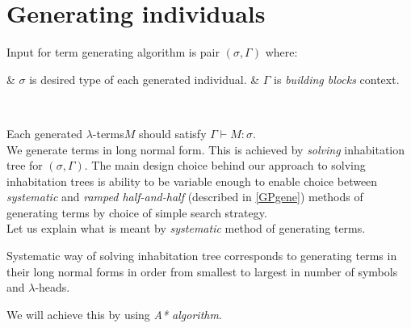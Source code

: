 \documentclass[12pt,a4paper]{report}
\makeatletter
\newcommand{\Lets}{Let us\xspace}
\newcommand{\lterms}{$\lambda$-terms\xspace}
\newcommand{\lheads}{$\lambda$-heads\xspace}
\newcommand{\turst}[3]{$#1\vdash{}#2:#3$\xspace}
\newcommand{\GMS}{\turst{\Gamma}{M}{\sigma}}
\newcommand{\atTree}{@-tree\xspace}
\newenvironment{enum}
{\begin{easylist}[itemize]}
{\end{easylist}}
\newenvironment{todo}
{ ~\\[0.5em]
  {\color{red}\textbf{TODO}}
  \begin{easylist}[itemize]}
{ \end{easylist}
  ~}
\makeatother
\begin{document}

\section{Generating individuals}



Input for term generating algorithm is pair $(\sigma,\Gamma)$ where:\\

\begin{enum}
 & $\sigma$ is desired type of each generated individual.
 & $\Gamma$ is \textit{building blocks} context. 
\end{enum}~
 
Each generated \lterms $M$ should  satisfy \GMS. \\

We generate terms in long normal form.
This is achieved by \textit{solving} inhabitation tree for $(\sigma,\Gamma)$.  
The main design choice behind our approach to solving inhabitation trees
is ability to be variable enough to enable choice between 
\textit{systematic}  
and \textit{ramped half-and-half} (described in \ref{GPgene}) 
methods of generating terms 
by choice of simple search strategy.\\

\Lets explain what is meant by \textit{systematic} 
method of generating terms. 

Systematic way of solving inhabitation tree corresponds to
generating terms in their long normal forms
in order from smallest to largest in number of symbols and \lheads.

We will achieve this by using \textit{A* algorithm}. 

\end{document}
